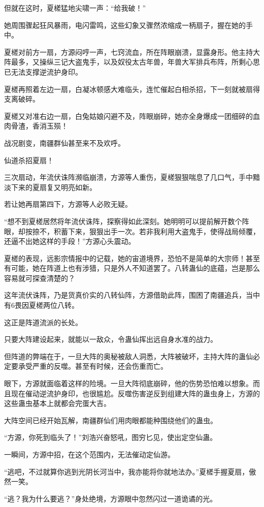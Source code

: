 \begin{this_body}
但就在这时，夏槎猛地尖啸一声：“给我破！”

她周围骤起狂风暴雨，电闪雷鸣，这些幻象又骤然浓缩成一柄扇子，握在她的手中。

夏槎对前方一扇，方源闷哼一声，七窍流血，所在阵眼崩溃，显露身形。他主持大阵最多，又操纵三记大盗鬼手，以及奴役太古年兽，年兽大军排兵布阵，所剩心思已无法支撑逆流护身印。

夏槎再照着左边一扇，白凝冰顿感大难临头，连忙催起白相杀招，下一刻就被扇得支离破碎。

夏槎又对准右边一扇，白兔姑娘闪避不及，阵眼崩碎，她亦全身爆成一团细碎的血肉骨渣，香消玉殒！

战况剧变，南疆群仙甚至来不及欢呼。

仙道杀招夏扇！

三次扇动，年流伏诛阵濒临崩溃，方源等人重伤，夏槎狠狠喘息了几口气，手中黯淡下来的夏扇复又明亮如新。

若让她再扇第四下，方源等人必败无疑。

“想不到夏槎居然将年流伏诛阵，探察得如此深刻。她明明可以提前解开数个阵眼，却按捺不，积蓄下来，狠狠出手一次。若非我利用大盗鬼手，使得战局倾覆，还逼不出她这样的手段！”方源心头震动。

夏槎的表现，远影宗情报中的记载，她的宙道境界，恐怕不是简单的大宗师！甚至有可能，她在阵道上也有涉猎，只是外人不知道罢了。八转蛊仙的底蕴，岂是那么容易就可探查清楚的？

这年流伏诛阵，乃是货真价实的八转仙阵，方源借助此阵，围困了南疆追兵，当中有6畏因夏槎两位八转。

这正是阵道流派的长处。

只要大阵建设起来，就能以一敌众，令蛊仙挥出远自身水准的战力。

但阵道的弊端在于，一旦大阵的奥秘被敌人洞悉，大阵被破坏，主持大阵的蛊仙必定要承受严重的反噬。甚至有时候，还会伤重而亡。

眼下，方源就面临着这样的险境。一旦大阵彻底崩碎，他的伤势恐怕难以想象。而且现在催动逆流护身印，也很尴尬。反噬伤害逆反到组建大阵的蛊虫身上，方源的这些蛊虫基本上就都会完蛋大吉。

大阵空间已经开始瓦解，南疆群仙们用肉眼都能种围绕他们的蛊虫。

“方源，你死到临头了！”刘浩兴奋怒吼，图穷匕见，使出定空仙蛊。

一瞬间，方源中招，在这个范围内，无法催动定仙游。

“逃吧，不过就算你逃到光阴长河当中，我亦能将你就地法办。”夏槎手握夏扇，傲然一笑。

“逃？我为什么要逃？”身处绝境，方源眼中忽然闪过一道诡谲的光。


\end{this_body}
